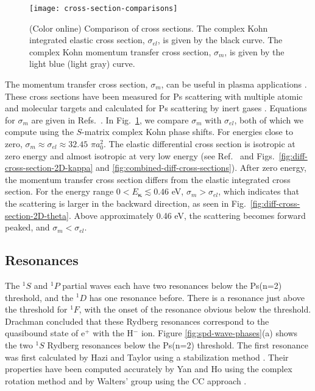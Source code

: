 \documentclass[preprint,showpacs,showkeys,preprintnumbers,amsmath,amssymb,longbibliography,pra,aps]{revtex4-1}
\begin{document}
{\begin{figure}[H]
	\centering
	\texttt{[image: cross-section-comparisons]}
	\caption{(Color online) Comparison of cross sections. The complex Kohn integrated
elastic cross section, $\sigma_{el}$, is given by the black curve. The complex
Kohn momentum transfer cross section, $\sigma_m$, is given by the
light blue (light gray) curve.} %
	\label{fig:cross-section-comparisons}
\end{figure}

The momentum transfer cross section, $\sigma_m$, can be useful in plasma applications
\cite{Wang2014, McEachran2014}. These cross sections have been measured for Ps
scattering with multiple atomic and molecular targets
\cite{Nagashima1998,Saito2003,Skalsey1998} and calculated
for Ps scattering by inert gases \cite{Blackwood2002c}. 
Equations for $\sigma_m$ are given
in Refs.~\cite{Bransden2003,Massey1969}.
In Fig.~\ref{fig:cross-section-comparisons}, we compare $\sigma_m$ with
$\sigma_{el}$, both of which we compute using the $S$-matrix complex Kohn phase shifts.
For energies close to zero,
$\sigma_m \approx \sigma_{el} \approx 32.45$ $\pi a_0^2$.
The elastic differential cross section is isotropic at zero energy and
almost isotropic at very low energy (see Ref.~\cite{Blackwood2002c} and
Figs.~\ref{fig:diff-cross-section-2D-kappa} and \ref{fig:combined-diff-cross-sections}).
After zero energy, the momentum transfer cross section differs from the
elastic integrated cross section. For the energy range
$0 < E_{\bm \kappa} \lesssim 0.46$ eV, $\sigma_m > \sigma_{el}$,
which indicates that the scattering is larger in the backward 
direction, as seen in Fig.~\ref{fig:diff-cross-section-2D-theta}.
Above approximately 0.46 eV, the scattering
becomes forward peaked, and $\sigma_m < \sigma_{el}$. %


\subsection{Resonances}
\label{sec:Resonances}

The $^1S$ and $^1P$ partial waves each have two resonances below the Ps(n=2) 
threshold, and the $^1D$ has one resonance before. There is a resonance just 
above the threshold for $^1F$, with the onset of the resonance obvious below the 
threshold. Drachman \cite{Drachman1979} concluded that these Rydberg 
resonances correspond to the quasibound state of e$^+$ with the H$^-$ ion.
Figure \ref{fig:spd-wave-phases}(a) shows the 
two $^1S$ Rydberg resonances below the Ps(n=2) threshold. The first resonance 
 was first 
calculated by Hazi and Taylor using a stabilization method \cite{Hazi1970}. 
Their properties have been computed accurately by Yan and Ho using the complex 
rotation method \cite{Yan1999} and by Walters' group using the CC 
approach \cite{Walters2004}.

}
\end{document}
